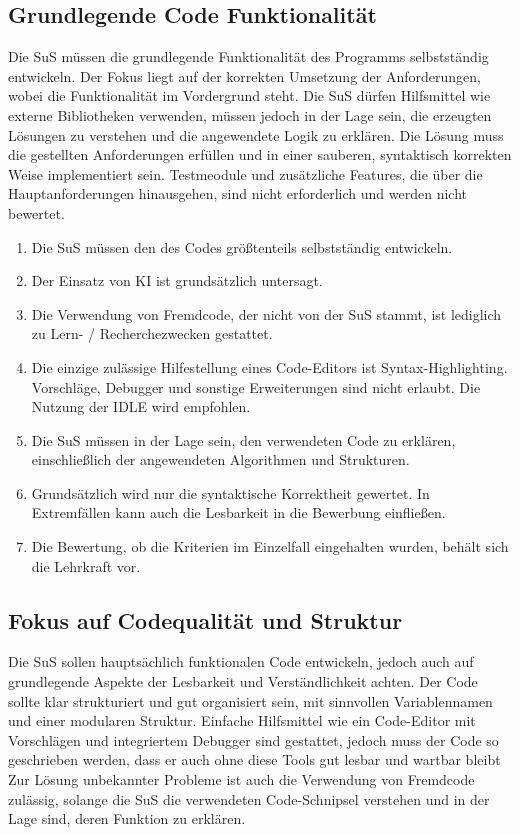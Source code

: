 \documentclass[a4paper,12pt]{article}
\begin{document}
\subsection{Grundlegende Code Funktionalität}
Die SuS müssen die grundlegende Funktionalität des Programms selbstständig entwickeln. Der Fokus liegt auf der korrekten Umsetzung der Anforderungen, wobei die Funktionalität im Vordergrund steht. Die SuS dürfen Hilfsmittel wie externe Bibliotheken verwenden, müssen jedoch in der Lage sein, die erzeugten Lösungen zu verstehen und die angewendete Logik zu erklären. Die Lösung muss die gestellten Anforderungen erfüllen und in einer sauberen, syntaktisch korrekten Weise implementiert sein. Testmeodule und zusätzliche Features, die über die Hauptanforderungen hinausgehen, sind nicht erforderlich und werden nicht bewertet.

\begin{enumerate}[label=\S\ \arabic*]
    \item Die SuS müssen den des Codes größtenteils selbstständig entwickeln.
    \item Der Einsatz von KI ist grundsätzlich untersagt.
    \item Die Verwendung von Fremdcode, der nicht von der SuS stammt, ist lediglich zu Lern- / Recherchezwecken gestattet.
    \item Die einzige zulässige Hilfestellung eines Code-Editors ist Syntax-Highlighting. Vorschläge, Debugger und sonstige Erweiterungen sind nicht erlaubt. Die Nutzung der IDLE wird empfohlen.
    \item Die SuS müssen in der Lage sein, den verwendeten Code zu erklären, einschließlich der angewendeten Algorithmen und Strukturen.
    \item Grundsätzlich wird nur die syntaktische Korrektheit gewertet. In Extremfällen kann auch die Lesbarkeit in die Bewerbung einfließen.
    \item Die Bewertung, ob die Kriterien im Einzelfall eingehalten wurden, behält sich die Lehrkraft vor.
\end{enumerate}


\subsection{Fokus auf Codequalität und Struktur}
Die SuS sollen hauptsächlich funktionalen Code entwickeln, jedoch auch auf grundlegende Aspekte der Lesbarkeit und Verständlichkeit achten. Der Code sollte klar strukturiert und gut organisiert sein, mit sinnvollen Variablennamen und einer modularen Struktur. Einfache Hilfsmittel wie ein Code-Editor mit Vorschlägen und integriertem Debugger sind gestattet, jedoch muss der Code so geschrieben werden, dass er auch ohne diese Tools gut lesbar und wartbar bleibt Zur Lösung unbekannter Probleme ist auch die Verwendung von Fremdcode zulässig, solange die SuS die verwendeten Code-Schnipsel verstehen und in der Lage sind, deren Funktion zu erklären.
\end{document}
